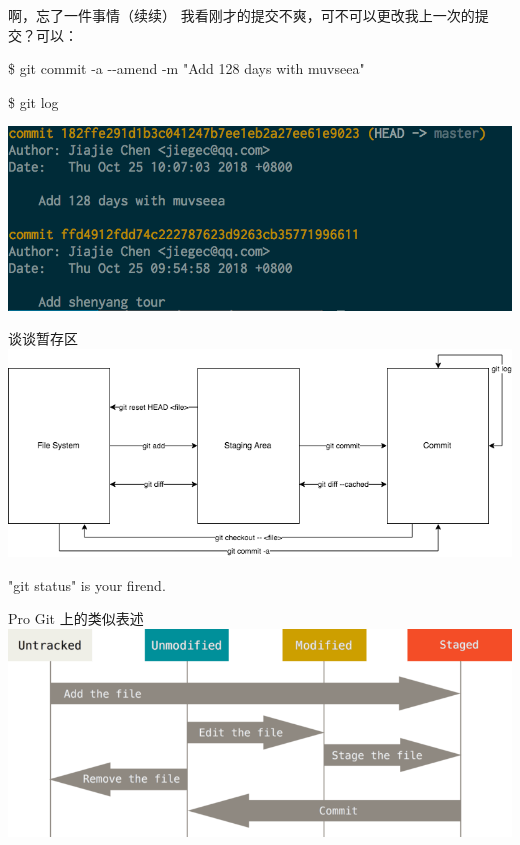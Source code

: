 \documentclass{beamer}
\begin{document}
\begin{frame}{啊，忘了一件事情（续续）}
    我看刚才的提交不爽，可不可以更改我上一次的提交？可以：

    \$ git commit -a -{}-amend -m "Add 128 days with muvseea"

    \$ git log

    \includegraphics[width=\linewidth]{2018-10-25-10-52-16.png}
\end{frame}

\begin{frame}{谈谈暂存区}
    \includegraphics[width=\linewidth]{2018-10-25-11-01-32.png}

    "git status" is your firend.
\end{frame}

\begin{frame}{Pro Git 上的类似表述}
    \includegraphics[width=\linewidth]{lifecycle.png}
\end{frame}
\end{document}
